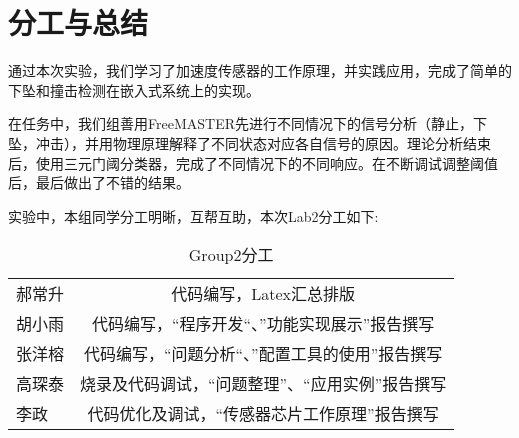 \section{分工与总结}
\par{通过本次实验，我们学习了加速度传感器的工作原理，并实践应用，完成了简单的下坠和撞击检测在嵌入式系统上的实现。}
\par{在任务中，我们组善用FreeMASTER先进行不同情况下的信号分析（静止，下坠，冲击），并用物理原理解释了不同状态对应各自信号的原因。理论分析结束后，使用三元门阈分类器，完成了不同情况下的不同响应。在不断调试调整阈值后，最后做出了不错的结果。}
\par{实验中，本组同学分工明晰，互帮互助，本次Lab2分工如下:}
\begin{table}[h]
	\centering
	\begin{tabular}{|l|c|}
		郝常升&代码编写，Latex汇总排版\\
		胡小雨&代码编写，“程序开发“、”功能实现展示”报告撰写\\
		张洋榕&代码编写，“问题分析“、”配置工具的使用”报告撰写\\
		高琛泰&烧录及代码调试，“问题整理”、“应用实例”报告撰写\\
		李政&代码优化及调试，“传感器芯片工作原理”报告撰写\\
	\end{tabular}
	\caption{Group2分工}
	\label{tab:Group2FG}
\end{table} 